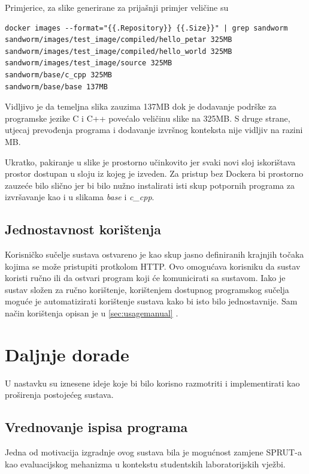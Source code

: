 \documentclass[times, utf8, zavrsni]{fer}
\begin{document}
{{Primjerice, za slike generirane za prijašnji primjer veličine su

\begin{lstlisting}
docker images --format="{{.Repository}} {{.Size}}" | grep sandworm
sandworm/images/test_image/compiled/hello_petar 325MB
sandworm/images/test_image/compiled/hello_world 325MB
sandworm/images/test_image/source 325MB
sandworm/base/c_cpp 325MB
sandworm/base/base 137MB
\end{lstlisting}

Vidljivo je da temeljna slika zauzima 137MB dok je dodavanje podrške za programske jezike C i C++ povećalo veličinu slike na 325MB. S druge strane, utjecaj prevođenja programa i dodavanje izvršnog konteksta nije vidljiv na razini MB.

Ukratko, pakiranje u slike je prostorno učinkovito jer svaki novi sloj iskorištava prostor dostupan u sloju iz kojeg je izveden. Za pristup bez Dockera bi prostorno zauzeće bilo slično jer bi bilo nužno instalirati isti skup potpornih programa za izvršavanje kao i u slikama {\textit{base}} i {\textit{c\_cpp}}.

\section{Jednostavnost korištenja}

Korisničko sučelje sustava ostvareno je kao skup jasno definiranih krajnjih točaka kojima se može pristupiti protkolom HTTP. Ovo omogućava korisniku da sustav koristi ručno ili da ostvari program koji će komunicirati sa sustavom. Iako je sustav složen za ručno korištenje, korištenjem dostupnog programskog sučelja moguće je automatizirati korištenje sustava kako bi isto bilo jednostavnije. Sam način korištenja opisan je u \ref{sec:usagemanual} .

\chapter{Daljnje dorade}

U nastavku su iznesene ideje koje bi bilo korisno razmotriti i implementirati kao proširenja postojećeg sustava.

\section{Vrednovanje ispisa programa}

Jedna od motivacija izgradnje ovog sustava bila je mogućnost zamjene SPRUT-a kao evaluacijskog mehanizma u kontekstu studentskih laboratorijskih vježbi.

}}
\end{document}
